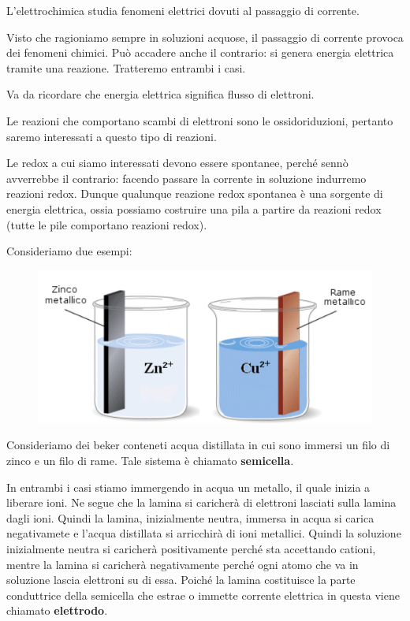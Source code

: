 L'elettrochimica studia fenomeni elettrici dovuti al passaggio di corrente.

Visto che ragioniamo sempre in soluzioni acquose, il passaggio di corrente provoca dei fenomeni chimici. Può accadere anche il contrario: si genera energia elettrica tramite una reazione. Tratteremo entrambi i casi.

\vspace{0.2cm}Va da ricordare che energia elettrica significa flusso di elettroni.

Le reazioni che comportano scambi di elettroni sono le ossidoriduzioni, pertanto saremo interessati a questo tipo di reazioni.

Le redox a cui siamo interessati devono essere spontanee, perché sennò avverrebbe il contrario: facendo passare la corrente in soluzione indurremo reazioni redox. Dunque qualunque reazione redox spontanea è una sorgente di energia elettrica, ossia possiamo costruire una pila a partire da reazioni redox (tutte le pile comportano reazioni redox).

Consideriamo due esempi:

\begin{figure}[H]
    \centering
    \includegraphics[width=12cm]{immagini/piastre_metalliche.png}
\end{figure}

Consideriamo dei beker conteneti acqua distillata in cui sono immersi un filo di zinco e un filo di rame. Tale sistema è chiamato \textbf{semicella}.

In entrambi i casi stiamo immergendo in acqua un metallo, il quale inizia a liberare ioni. Ne segue che la lamina si caricherà di elettroni lasciati sulla lamina dagli ioni. Quindi la lamina, inizialmente neutra, immersa in acqua si carica negativamete e l'acqua distillata si arricchirà di ioni metallici. Quindi la soluzione inizialmente neutra si caricherà positivamente perché sta accettando cationi, mentre la lamina si caricherà negativamente perché ogni atomo che va in soluzione lascia elettroni su di essa. Poiché la lamina costituisce la parte conduttrice della semicella che estrae o immette corrente elettrica in questa viene chiamato \textbf{elettrodo}.

